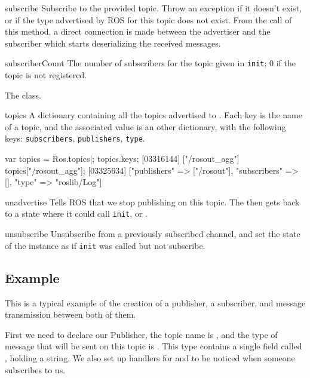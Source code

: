 \begin{urbiscriptapi}
\item[subscribe]%
  Subscribe to the provided topic. Throw an exception if it doesn't exist, or
  if the type advertised by ROS for this topic does not exist.  From the
  call of this method, a direct connection is made between the advertiser
  and the subscriber which starts deserializing the received messages.


\item[subscriberCount]%
  The number of subscribers for the topic given in \lstinline{init}; 0 if
  the topic is not registered.


\item[Topic]%
  The  class.


\item[topics]%
  A dictionary containing all the topics advertised to
  . Each key is the name of a topic, and the associated
  value is an other dictionary, with the following keys:
  \lstinline{subscribers}, \lstinline{publishers}, \lstinline{type}.
\begin{urbiscript}
var topics = Ros.topics|;
topics.keys;
[03316144] ["/rosout_agg"]
topics["/rosout_agg"];
[03325634] ["publishers" => ["/rosout"], "subscribers" => [], "type" => "roslib/Log"]
\end{urbiscript}


\item[unadvertise]%
  Tells ROS that we stop publishing on this topic. The \UObject then gets back
  to a state where it could call \lstinline{init},  or
  .


\item[unsubscribe]%
  Unsubscribe from a previously subscribed channel, and set the state of the
  instance as if \lstinline{init} was called but not subscribe.
\end{urbiscriptapi}


\subsection{Example}

This is a typical example of the creation of a publisher, a subscriber, and
message transmission between both of them.

First we need to declare our Publisher, the topic name is ,
and the type of message that will be sent on this topic is
. This type contains a single field called
, holding a string.  We also set up handlers for
 and  to be noticed when someone
subscribes to us.

